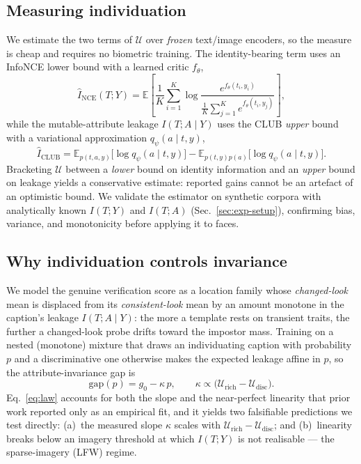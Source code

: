 \documentclass[10pt,twocolumn,letterpaper]{article}
\newcommand{\U}{\mathcal{U}}
\begin{document}
\subsection{Measuring individuation}
\label{sec:measure}
We estimate the two terms of $\U$ over \emph{frozen} text/image encoders, so the measure is
cheap and requires no biometric training. The identity-bearing term uses an InfoNCE lower bound
with a learned critic $f_\theta$,
\begin{equation}
  \hat I_{\text{NCE}}(T;Y)=\mathbb{E}\!\left[\frac{1}{K}\sum_{i=1}^{K}
    \log\frac{e^{f_\theta(t_i,y_i)}}{\frac{1}{K}\sum_{j=1}^{K}e^{f_\theta(t_i,y_j)}}\right],
  \label{eq:nce}
\end{equation}
while the mutable-attribute leakage $I(T;A\mid Y)$ uses the CLUB \emph{upper} bound with a
variational approximation $q_\psi(a\mid t,y)$,
\begin{equation}
  \hat I_{\text{CLUB}}=\mathbb{E}_{p(t,a,y)}\!\big[\log q_\psi(a\mid t,y)\big]
    -\mathbb{E}_{p(t,y)p(a)}\!\big[\log q_\psi(a\mid t,y)\big].
  \label{eq:club}
\end{equation}
Bracketing $\U$ between a \emph{lower} bound on identity information and an \emph{upper} bound
on leakage yields a conservative estimate: reported gains cannot be an artefact of an optimistic
bound. We validate the estimator on synthetic corpora with analytically known $I(T;Y)$ and
$I(T;A)$ (Sec.~\ref{sec:exp-setup}), confirming bias, variance, and monotonicity before applying
it to faces.

\subsection{Why individuation controls invariance}
\label{sec:theory}
We model the genuine verification score as a location family whose \emph{changed-look} mean is
displaced from its \emph{consistent-look} mean by an amount monotone in the caption's leakage
$I(T;A\mid Y)$: the more a template rests on transient traits, the further a changed-look probe
drifts toward the impostor mass. Training on a nested (monotone) mixture that draws an
individuating caption with probability $p$ and a discriminative one otherwise makes the expected
leakage affine in $p$, so the attribute-invariance gap is
\begin{equation}
  \mathrm{gap}(p)=g_0-\kappa\,p,\qquad \kappa\propto\big(\U_{\text{rich}}-\U_{\text{disc}}\big).
  \label{eq:law}
\end{equation}
Eq.~\ref{eq:law} accounts for both the slope and the near-perfect linearity that prior work
reported only as an empirical fit, and it yields two falsifiable predictions we test directly:
(a)~the measured slope $\kappa$ scales with $\U_{\text{rich}}-\U_{\text{disc}}$; and (b)~linearity
breaks below an imagery threshold at which $I(T;Y)$ is not realisable --- the sparse-imagery
(LFW) regime.
\end{document}
